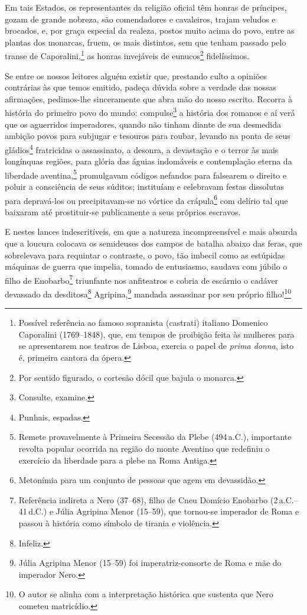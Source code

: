 Em tais Estados, os representantes da religião oficial têm honras de
príncipes, gozam de grande nobreza, são comendadores e cavaleiros,
trajam veludos e brocados, e, por graça especial da realeza, postos
muito acima do povo, entre as plantas dos monarcas, fruem, os mais
distintos, sem que tenham passado pelo transe de Caporalini,\footnote{
  Possível referência ao famoso sopranista (castrati) italiano Domenico
  Caporalini (1769--1848), que, em tempos de proibição feita às mulheres
  para se apresentarem nos teatros de Lisboa, exercia o papel de \textit{prima
    donna}, isto é, primeira cantora da ópera.} as honras invejáveis de
eunucos\footnote{Por sentido figurado, o cortesão dócil que bajula o
  monarca.} fidelíssimos.

Se entre os nossos leitores alguém existir que, prestando culto a
opiniões contrárias às que temos emitido, padeça dúvida sobre a verdade
das nossas afirmações, pedimos-lhe sinceramente que abra mão do nosso
escrito. Recorra à história do primeiro povo do mundo:
compulse\footnote{Consulte, examine.} a história dos romanos e aí verá
que os aguerridos imperadores, quando não tinham diante de sua desmedida
ambição povos para subjugar e tesouros para roubar, levando na ponta de
seus gládios\footnote{Punhais, espadas.} fratricidas o assassinato, a
desonra, a devastação e o terror às mais longínquas regiões, para glória
das águias indomáveis e contemplação eterna da liberdade
aventina,\footnote{Remete provavelmente à Primeira Secessão da Plebe
  (494\,a.C.), importante revolta popular ocorrida na região do monte
  Aventino que redefiniu o exercício da liberdade para a plebe na Roma
  Antiga.} promulgavam códigos nefandos para falsearem o direito e
poluir a consciência de seus súditos; instituíam e celebravam festas
dissolutas para depravá-los ou precipitavam-se no vórtice da
crápula\footnote{Metonímia para um conjunto de pessoas que agem em
  devassidão.} com delírio tal que baixaram até prostituir-se
publicamente a seus próprios escravos.

E nestes lances indescritíveis, em que a natureza incompreensível e mais
absurda que a loucura colocava os semideuses dos campos de batalha
abaixo das feras, que sobrelevava para requintar o contraste, o povo,
tão imbecil como as estúpidas máquinas de guerra que impelia, tomado de
entusiasmo, saudava com júbilo o filho de Enobarbo\footnote{Referência
  indireta a Nero (37--68), filho de Cneu Domício Enobarbo (2\,a.C.--41\,d.C.) e
  Júlia Agripina Menor (15--59), que tornou-se imperador de Roma e passou
  à história como símbolo de tirania e violência.} triunfante nos
anfiteatros e cobria de escárnio o cadáver devassado da
desditosa\footnote{Infeliz.} Agripina,\footnote{Júlia Agripina Menor
  (15--59) foi imperatriz-consorte de Roma e mãe do imperador Nero.}
mandada assassinar por seu próprio filho!\footnote{O autor se alinha
  com a interpretação histórica que sustenta que Nero cometeu
  matricídio.}


